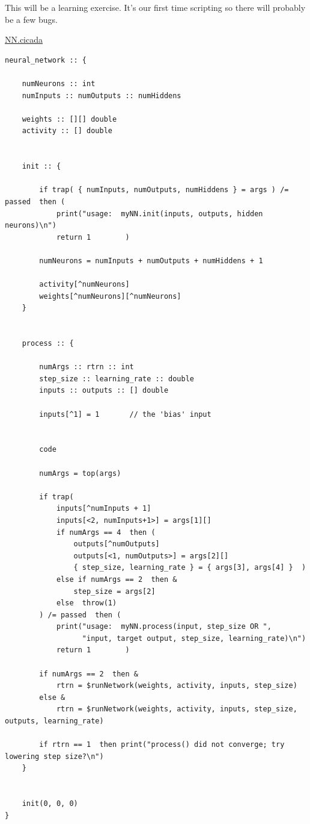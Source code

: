 \documentclass{article}
\newenvironment{longcode}{
       \begin{list}{}{
               \setlength{\leftmargin}{0in}
               \setlength{\rightmargin}{0in}
               \setlength{\topsep}{.2in}
       }
       \small
       \item[] }
       { \end{list}   }
\begin{document}
This will be a learning exercise.  It's our first time scripting so there will probably be a few bugs.\\\vspace{.2in}

\noindent \underline{NN.cicada}

\begin{longcode} \begin{verbatim}
neural_network :: {
    
    numNeurons :: int
    numInputs :: numOutputs :: numHiddens
    
    weights :: [][] double
    activity :: [] double
    
    
    init :: {
        
        if trap( { numInputs, numOutputs, numHiddens } = args ) /= passed  then (
            print("usage:  myNN.init(inputs, outputs, hidden neurons)\n")
            return 1        )
        
        numNeurons = numInputs + numOutputs + numHiddens + 1
        
        activity[^numNeurons]
        weights[^numNeurons][^numNeurons]
    }
    
    
    process :: {
        
        numArgs :: rtrn :: int
        step_size :: learning_rate :: double
        inputs :: outputs :: [] double
        
        inputs[^1] = 1       // the 'bias' input
        
        
        code
        
        numArgs = top(args)
        
        if trap(
            inputs[^numInputs + 1]
            inputs[<2, numInputs+1>] = args[1][]
            if numArgs == 4  then (
                outputs[^numOutputs]
                outputs[<1, numOutputs>] = args[2][]
                { step_size, learning_rate } = { args[3], args[4] }  )
            else if numArgs == 2  then &
                step_size = args[2]
            else  throw(1)
        ) /= passed  then (
            print("usage:  myNN.process(input, step_size OR ",
                  "input, target output, step_size, learning_rate)\n")
            return 1        )
        
        if numArgs == 2  then &
            rtrn = $runNetwork(weights, activity, inputs, step_size)
        else &
            rtrn = $runNetwork(weights, activity, inputs, step_size, outputs, learning_rate)
        
        if rtrn == 1  then print("process() did not converge; try lowering step size?\n")
    }
    
    
    init(0, 0, 0)
}
\end{verbatim} \end{longcode}
\end{document}
